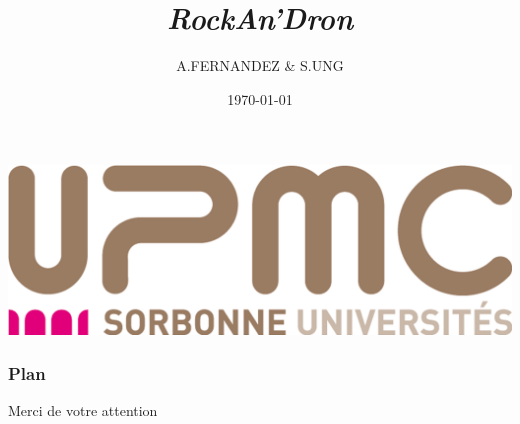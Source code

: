 \documentclass[xcolor={dvipsnames}, handout]{beamer}
\title{\textit{RockAn’Dron}}
\author{A.FERNANDEZ \& S.UNG}
\institute{Projet STL

encadré par V.BOTBOL \& G.ZIAT}
\date{\today}
\begin{document}
{
}

\begin{frame}
\titlepage
\begin{center}
\includegraphics[scale=0.05]{images/logo_upmc.jpg}
\end{center}
\end{frame}

\begin{frame}
\frametitle{Plan}
\setcounter{tocdepth}{1}
\tableofcontents
\end{frame}





\begin{frame}
\begin{center}
Merci de votre attention
\end{center}
\end{frame}
\end{document}

